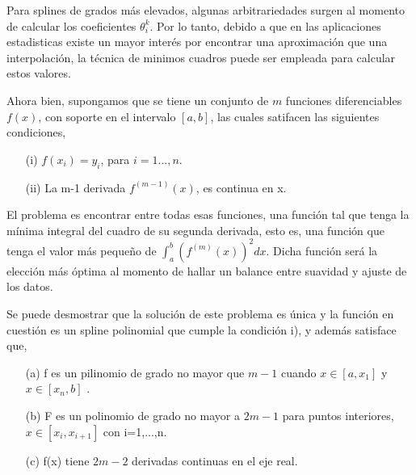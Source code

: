 \hspace{0.4cm}Para splines de grados m\'as elevados, algunas arbitrariedades surgen al momento de calcular los coeficientes $\theta_{i}^{k}$. Por lo tanto, debido a que en las aplicaciones estadisticas existe un mayor inter\'es por encontrar una aproximaci\'on que una interpolaci\'on, la t\'ecnica de minimos cuadros puede ser empleada para calcular estos valores.


\hspace{0.4cm} Ahora bien, supongamos que se tiene un conjunto de $m$ funciones diferenciables $f(x)$, con soporte en el intervalo $[a,b]$, las cuales satifacen las siguientes condiciones,


\begin{itemize}
  \item[(i)] $f(x_{i})=y_{i}$, para $i=1...,n$.
  \item[(ii)] La m-1 derivada $f^{(m-1)}(x)$, es continua en x.
\end{itemize}

\hspace{0.4cm} El problema es encontrar entre todas esas funciones, una funci\'on tal que tenga la m\'inima integral del cuadro de su segunda derivada, esto es, una funci\'on que tenga el valor m\'as peque\~no de $\int_{a}^{b} (f^{(m)}(x))^2 dx$. Dicha funci\'on ser\'a la elecci\'on m\'as \'optima al momento de hallar un balance entre suavidad y ajuste de los datos.


\hspace{0.4cm} Se puede desmostrar que la soluci\'on de este problema es \'unica y la funci\'on en cuesti\'on es un spline polinomial que cumple la condici\'on i), y adem\'as satisface que,

\begin{itemize}
  \item[(a)] f es un pilinomio de grado no mayor que $m-1$ cuando $x \in [a,x_{1}]$ y $x \in [x_{n},b]$ .
  \item[(b)] F es un polinomio de grado no mayor a $2m-1$ para puntos interiores, $x \in [x_{i},x_{i+1}]$ con i=1,...,n.
  \item[(c)] f(x) tiene $2m-2$ derivadas continuas en el eje real.
\end{itemize}

